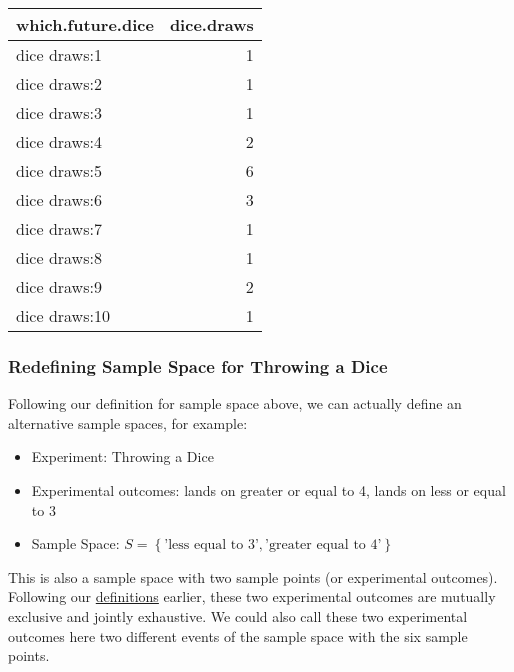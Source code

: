 \documentclass[
]{book}
\providecommand{\tightlist}{%
  \setlength{\itemsep}{0pt}\setlength{\parskip}{0pt}}
\begin{document}
\begin{table}[!h]
\centering
\begin{tabular}{l|r}
\hline
which.future.dice & dice.draws\\
\hline
\rowcolor{gray!6}  dice draws:1 & 1\\
\hline
dice draws:2 & 1\\
\hline
\rowcolor{gray!6}  dice draws:3 & 1\\
\hline
dice draws:4 & 2\\
\hline
\rowcolor{gray!6}  dice draws:5 & 6\\
\hline
dice draws:6 & 3\\
\hline
\rowcolor{gray!6}  dice draws:7 & 1\\
\hline
dice draws:8 & 1\\
\hline
\rowcolor{gray!6}  dice draws:9 & 2\\
\hline
dice draws:10 & 1\\
\hline
\end{tabular}
\end{table}

\hypertarget{redefining-sample-space-for-throwing-a-dice}{%
\subsubsection{Redefining Sample Space for Throwing a Dice}\label{redefining-sample-space-for-throwing-a-dice}}

Following our definition for sample space above, we can actually define an alternative sample spaces, for example:

\begin{itemize}
\tightlist
\item
  Experiment: Throwing a Dice
\item
  Experimental outcomes: lands on greater or equal to 4, lands on less or equal to 3
\item
  Sample Space: \(S=\left\{\text{'less equal to 3'}, \text{'greater equal to 4'}\right\}\)
\end{itemize}

This is also a sample space with two sample points (or experimental outcomes). Following our \href{https://fanwangecon.github.io/Stat4Econ/probability/htmlpdfr/samplespace.html}{definitions} earlier, these two experimental outcomes are mutually exclusive and jointly exhaustive. We could also call these two experimental outcomes here two different events of the sample space with the six sample points.
\end{document}
